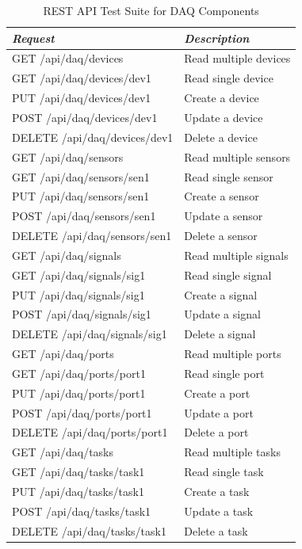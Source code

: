       \begin{table}[H]
        \centering
        \begin{tabular}{p{3in} p{3in}}
          \toprule
          \emph{Request} & \emph{Description} \\ [0.5ex]
          \midrule
             GET /api/daq/devices       & Read multiple devices \\
             GET /api/daq/devices/dev1  &   Read single device \\
             PUT /api/daq/devices/dev1  &      Create a device \\
            POST /api/daq/devices/dev1  &      Update a device \\
          DELETE /api/daq/devices/dev1  &      Delete a device \\
             GET /api/daq/sensors       & Read multiple sensors \\
             GET /api/daq/sensors/sen1  &   Read single sensor \\
             PUT /api/daq/sensors/sen1  &      Create a sensor \\
            POST /api/daq/sensors/sen1  &      Update a sensor \\
          DELETE /api/daq/sensors/sen1  &      Delete a sensor \\
             GET /api/daq/signals       & Read multiple signals \\
             GET /api/daq/signals/sig1  &   Read single signal \\
             PUT /api/daq/signals/sig1  &      Create a signal \\
            POST /api/daq/signals/sig1  &      Update a signal \\
          DELETE /api/daq/signals/sig1  &      Delete a signal \\
             GET /api/daq/ports        & Read multiple ports \\
             GET /api/daq/ports/port1  &   Read single port \\
             PUT /api/daq/ports/port1  &      Create a port \\
            POST /api/daq/ports/port1  &      Update a port \\
          DELETE /api/daq/ports/port1  &      Delete a port \\
             GET /api/daq/tasks        & Read multiple tasks \\
             GET /api/daq/tasks/task1  &   Read single task \\
             PUT /api/daq/tasks/task1  &      Create a task \\
            POST /api/daq/tasks/task1  &      Update a task \\
          DELETE /api/daq/tasks/task1  &      Delete a task \\
          \bottomrule
        \end{tabular}
        \caption{REST API Test Suite for DAQ Components}\label{tab:test-rest-daq-suite}
      \end{table}

